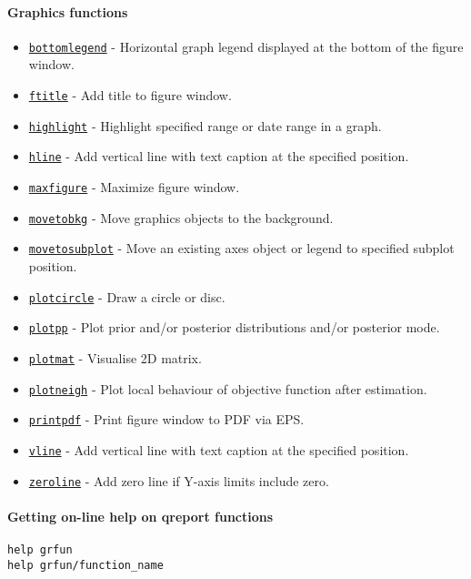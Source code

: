 

	\paragraph{Graphics functions}

\begin{itemize}
\itemsep1pt\parskip0pt
\item
  \href{grfun/bottomlegend}{\texttt{bottomlegend}} - Horizontal graph
  legend displayed at the bottom of the figure window.
\item
  \href{grfun/ftitle}{\texttt{ftitle}} - Add title to figure window.
\item
  \href{grfun/highlight}{\texttt{highlight}} - Highlight specified range
  or date range in a graph.
\item
  \href{grfun/hline}{\texttt{hline}} - Add vertical line with text
  caption at the specified position.
\item
  \href{grfun/maxfigure}{\texttt{maxfigure}} - Maximize figure window.
\item
  \href{grfun/movetobkg}{\texttt{movetobkg}} - Move graphics objects to
  the background.
\item
  \href{grfun/movetosubplot}{\texttt{movetosubplot}} - Move an existing
  axes object or legend to specified subplot position.
\item
  \href{grfun/plotcircle}{\texttt{plotcircle}} - Draw a circle or disc.
\item
  \href{grfun/plotpp}{\texttt{plotpp}} - Plot prior and/or posterior
  distributions and/or posterior mode.
\item
  \href{grfun/plotmat}{\texttt{plotmat}} - Visualise 2D matrix.
\item
  \href{grfun/plotneigh}{\texttt{plotneigh}} - Plot local behaviour of
  objective function after estimation.
\item
  \href{grfun/printpdf}{\texttt{printpdf}} - Print figure window to PDF
  via EPS.
\item
  \href{grfun/vline}{\texttt{vline}} - Add vertical line with text
  caption at the specified position.
\item
  \href{grfun/zeroline}{\texttt{zeroline}} - Add zero line if Y-axis
  limits include zero.
\end{itemize}

\paragraph{Getting on-line help on qreport
functions}

\begin{verbatim}
help grfun
help grfun/function_name
\end{verbatim}



